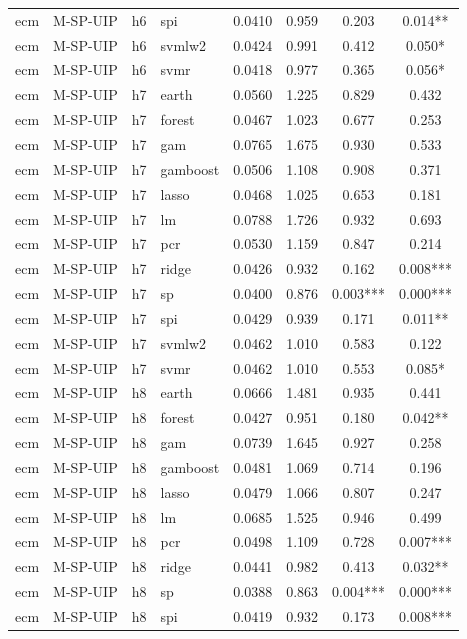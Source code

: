 \begin{ThreePartTable}
\begin{longtable}[t]{llclcccc}
ecm & M-SP-UIP & h6 & spi & 0.0410 & 0.959 & 0.203 & 0.014**\\
ecm & M-SP-UIP & h6 & svmlw2 & 0.0424 & 0.991 & 0.412 & 0.050*\\
ecm & M-SP-UIP & h6 & svmr & 0.0418 & 0.977 & 0.365 & 0.056*\\
\addlinespace
ecm & M-SP-UIP & h7 & earth & 0.0560 & 1.225 & 0.829 & 0.432\\
ecm & M-SP-UIP & h7 & forest & 0.0467 & 1.023 & 0.677 & 0.253\\
ecm & M-SP-UIP & h7 & gam & 0.0765 & 1.675 & 0.930 & 0.533\\
ecm & M-SP-UIP & h7 & gamboost & 0.0506 & 1.108 & 0.908 & 0.371\\
ecm & M-SP-UIP & h7 & lasso & 0.0468 & 1.025 & 0.653 & 0.181\\
ecm & M-SP-UIP & h7 & lm & 0.0788 & 1.726 & 0.932 & 0.693\\
ecm & M-SP-UIP & h7 & pcr & 0.0530 & 1.159 & 0.847 & 0.214\\
ecm & M-SP-UIP & h7 & ridge & 0.0426 & 0.932 & 0.162 & 0.008***\\
ecm & M-SP-UIP & h7 & sp & 0.0400 & 0.876 & 0.003*** & 0.000***\\
ecm & M-SP-UIP & h7 & spi & 0.0429 & 0.939 & 0.171 & 0.011**\\
ecm & M-SP-UIP & h7 & svmlw2 & 0.0462 & 1.010 & 0.583 & 0.122\\
ecm & M-SP-UIP & h7 & svmr & 0.0462 & 1.010 & 0.553 & 0.085*\\
\addlinespace
ecm & M-SP-UIP & h8 & earth & 0.0666 & 1.481 & 0.935 & 0.441\\
ecm & M-SP-UIP & h8 & forest & 0.0427 & 0.951 & 0.180 & 0.042**\\
ecm & M-SP-UIP & h8 & gam & 0.0739 & 1.645 & 0.927 & 0.258\\
ecm & M-SP-UIP & h8 & gamboost & 0.0481 & 1.069 & 0.714 & 0.196\\
ecm & M-SP-UIP & h8 & lasso & 0.0479 & 1.066 & 0.807 & 0.247\\
ecm & M-SP-UIP & h8 & lm & 0.0685 & 1.525 & 0.946 & 0.499\\
ecm & M-SP-UIP & h8 & pcr & 0.0498 & 1.109 & 0.728 & 0.007***\\
ecm & M-SP-UIP & h8 & ridge & 0.0441 & 0.982 & 0.413 & 0.032**\\
ecm & M-SP-UIP & h8 & sp & 0.0388 & 0.863 & 0.004*** & 0.000***\\
ecm & M-SP-UIP & h8 & spi & 0.0419 & 0.932 & 0.173 & 0.008***\\

\end{longtable}
\end{ThreePartTable}
